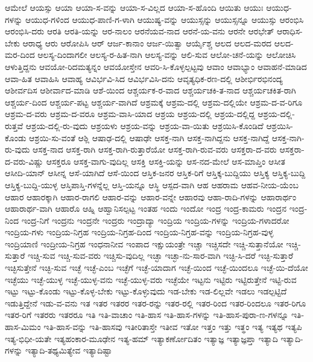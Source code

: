 {ಆಮೇಲೆ
ಆಯಸ್ಸು
ಆಯಾ
ಆಯಾ-ಸ-ವನ್ನು
ಆಯಾ-ಸ-ವಿಲ್ಲದ
ಆಯಾ-ಸ-ಹೊಂದಿ
ಆಯಿತು
ಆಯುಃ
ಆಯುಧ-ಗಳನ್ನು
ಆಯುಧ-ಗಳಿಂದ
ಆಯುಧ-ಪಾಣಿ-ಗ-ಳಾಗಿ
ಆಯುಷ್ಯ-ವನ್ನು
ಆಯುಸ್ಸನ್ನು
ಆಯುಸ್ಸನ್ನೂ
ಆಯುಸ್ಸು
ಆರಂಭಿಸಿ
ಆರಂಭಿಸಿ-ದರು
ಆರತಿ
ಆರತಿ-ಯನ್ನು
ಆರ-ನಾಲಂ
ಆರನೆಯವ-ನಾದ
ಆರನೆ-ಯ-ವನು
ಆರನೇ
ಆರಭೇತ್
ಆರಾಧಿಸ-ಬೇಕು
ಆರಾಧ್ಯ
ಆರು
ಆರೋಪಿಸಿ
ಆರ್
ಆರ್ಜ-ಕಾನಾಂ
ಆರ್ಜ-ಯಿತ್ವಾ
ಆರ್ಯೈಶ್ಚ
ಆಲದ
ಆಲದ-ಮರದ
ಆಲದ-ಮರ-ದಿಂದ
ಆಲಸ್ಯ-ದಿಂದಾಗಲೀ
ಆಲಸ್ಯ-ರ-ಹಿತ-ನಾಗಿ
ಆಲಸ್ಯ-ವನ್ನು
ಆಲಿ-ಸುವ
ಆಲೋ-ಚನೆ-ಯನ್ನು
ಆಲೋಚಿಸಿ
ಆಳುತ್ತಿದ್ದನು
ಆವಯೋ-ರಿದಮತ್ಯನ್ನಂ
ಆವಯೋಸ್ತೇನ
ಆವರಿ-ಸಿ-ಕೊಳ್ಳಲ್ಪಟ್ಟವು
ಆವಾಂ
ಆವಾಭ್ಯಾಂ
ಆವಾಹನೆ-ಮಾಡಿದ
ಆವಾ-ಹಿತ
ಆವಾಹಿಸಿ
ಆವಾಹ್ಯ
ಆವಿರ್ಭವಿ-ಸಿದ
ಆವಿರ್ಭವಿಸಿ-ದನು
ಆವೃತ್ಯಧಿಕ-ರಣ-ದಲ್ಲಿ
ಆಶೀರ್ಭಿರಭಿನಂದ್ಯ
ಆಶೀರ್ವದಿಸ
ಆಶೀರ್ವಾದ-ಮಾಡಿ
ಆಶೆ-ಯಿಂದ
ಆಶ್ಚರ್ಯಕ-ರ-ವಾದ
ಆಶ್ಚರ್ಯಚಕಿ-ತ-ನಾದ
ಆಶ್ಚರ್ಯಚಕಿತ-ರಾಗಿ
ಆಶ್ಚರ್ಯ-ದಿಂದ
ಆಶ್ಚರ್ಯ-ಪಟ್ಟ
ಆಶ್ಚರ್ಯ-ವಾಗಿದೆ
ಆಶ್ರಮಕ್ಕೆ
ಆಶ್ರಮ-ದಲ್ಲಿ
ಆಶ್ರಮ-ದಲ್ಲಿಯೇ
ಆಶ್ರಮ-ದ-ವ-ರಿಗೂ
ಆಶ್ರಮ-ದ-ವರು
ಆಶ್ರಮ-ದ-ವರೂ
ಆಶ್ರಮ-ವಾಸಿ-ಯಾದ
ಆಶ್ರಯ
ಆಶ್ರಯ-ದಲ್ಲಿ
ಆಶ್ರಯ-ದಲ್ಲಿದ್ದ
ಆಶ್ರಯ-ದಲ್ಲಿ-ರುತ್ತವೆ
ಆಶ್ರಯ-ದಲ್ಲಿ-ರು-ವುದು
ಆಶ್ರಯಳು
ಆಶ್ರಯ-ವನ್ನು
ಆಶ್ರಯ-ವಾ-ಯಿತು
ಆಶ್ರಯಿಸಿ-ಕೊಂಡಿದೆ
ಆಶ್ರಯಿಸಿ-ಕೊಂಡು
ಆಶ್ರಯಿ-ಸು-ವಂತೆ
ಆಶ್ಲಿ
ಆಷಾಢ-ದಲ್ಲಿ
ಆಷಾಢೇ
ಆಸಕ್ತ-ನಾಗಿ
ಆಸಕ್ತ-ನಾಗಿದ್ದನು
ಆಸಕ್ತ-ನಾಗಿದ್ದೆ
ಆಸಕ್ತ-ನಾಗಿ-ರು-ವುದು
ಆಸಕ್ತ-ನಾದ
ಆಸಕ್ತ-ರಾಗಿ
ಆಸಕ್ತ-ರಾಗಿ-ರುತ್ತಾರೆಯೋ
ಆಸಕ್ತ-ರಾಗಿ-ರುವ-ವರು
ಆಸಕ್ತರಾ-ದ-ವರು
ಆಸಕ್ತರಾ-ದ-ವರು-ವಿಷ್ಣು
ಆಸಕ್ತರೂ
ಆಸಕ್ತ-ವಾಗು-ವುದಿಲ್ಲ
ಆಸಕ್ತಿ
ಆಸಕ್ತಿ-ಯನ್ನು
ಆಸ-ನದ-ಮೇಲೆ
ಆಸ-ಮಾಪ್ತಿಂ
ಆಸೀತ
ಆಸೀದಿ-ಯಾನ್
ಆಸೀನ್ನ
ಆಸೆ-ಯಾಗಿದೆ
ಆಸೆ-ಯಿಂದ
ಆಸ್ತಿಕ-ಜನರ
ಆಸ್ತಿಕ-ರಿಗೆ
ಆಸ್ತಿಕ್ಕ-ಬುದ್ದಿಯು
ಆಸ್ತಿಕ್ಯ
ಆಸ್ತಿಕ್ಯ-ಬುದ್ದಿ
ಆಸ್ತಿಕ್ಯ-ಬುದ್ದಿ-ಯುಳ್ಳ
ಆಸ್ತಿಪಾಸ್ತಿ-ಗಳನ್ನೆಲ್ಲ
ಆಸ್ತಿ-ಯನ್ನೂ
ಆಸ್ಥಿ
ಆಸ್ಪದ-ವಾಗಿ
ಆಹ
ಆಹರಾಮ
ಆಹವ-ನೀಯ-ಯೆಂಬ
ಆಹಾರ
ಆಹಾರಕ್ಕಾಗಿ
ಆಹಾರ-ರಾಗಲಿ
ಆಹಾರ-ವನ್ನು
ಆಹಾರ-ವನ್ನೇ
ಆಹಾರವು
ಆಹಾ-ರಾದಿ-ಗಳನ್ನು
ಆಹಾರಾರ್ಥಂ
ಆಹಾರಾರ್ಥ-ವಾಗಿ
ಆಹಾರೊ
ಆಹ್ನಿ
ಆಹ್ವಾನಿಸಲ್ಪಟ್ಟ
ಇಂತಹ
ಇಂದು
ಇಂದೋ
ಇಂದ್ರ
ಇಂದ್ರ-ಕಾಮರು
ಇಂದ್ರನ
ಇಂದ್ರ-ನಿಂದ
ಇಂದ್ರ-ನಿಗೆ
ಇಂದ್ರನು
ಇಂದ್ರನೇ
ಇಂದ್ರರು
ಇಂದ್ರಾದ್ಯಾ
ಇಂದ್ರಿಯ
ಇಂದ್ರಿಯ-ಗಳನ್ನು
ಇಂದ್ರಿಯ-ಗಳಾದರೋ
ಇಂದ್ರಿಯ-ಗಳು
ಇಂದ್ರಿಯ-ನಿಗ್ರಹ
ಇಂದ್ರಿಯ-ನಿಗ್ರಹ-ದಿಂದ
ಇಂದ್ರಿಯ-ನಿಗ್ರಹ-ವನ್ನು
ಇಂದ್ರಿಯ-ನಿಗ್ರಹ-ವುಳ್ಳ
ಇಂದ್ರಿಯಾಣಿ
ಇಂದ್ರೀಯ-ನಿಗ್ರಹ
ಇಂಧನಾನೀವ
ಇಂಪಾದ
ಇಕ್ಷುಯಂತ್ರೇ
ಇಚ್ಚಾ
ಇಚ್ಚಿಸದೇ
ಇಚ್ಚಿ-ಸುತ್ತಾನೆಯೋ
ಇಚ್ಚಿ-ಸುತ್ತಾರೆ
ಇಚ್ಚಿ-ಸುವ
ಇಚ್ಚಿ-ಸುವ-ವರು
ಇಚ್ಚಿಸು-ವುದಿಲ್ಲ
ಇಚ್ಛಾ
ಇಚ್ಛಾ-ನು-ಸಾರ-ವಾಗಿ
ಇಚ್ಛಿ-ಸಿ-ದರೆ
ಇಚ್ಛಿ-ಸುತ್ತಾರೆ
ಇಚ್ಛಿಸುತ್ತೇನೆ
ಇಚ್ಛಿ-ಸುವ
ಇಚ್ಛೆ
ಇಚ್ಛೆ-ಎಂಬ
ಇಚ್ಛೆಗೆ
ಇಚ್ಛೆ-ಯಾದಾಗ
ಇಚ್ಛೆ-ಯಿಂದ
ಇಚ್ಛೆ-ಯಿಂದಲೂ
ಇಚ್ಛೆ-ಯಿ-ದೆಯೋ
ಇಚ್ಛೆಯು
ಇಚ್ಛೆ-ಯುಳ್ಳ
ಇಚ್ಛೆ-ಯುಳ್ಳ-ವನು
ಇಚ್ಛೆ-ಯುಳ್ಳ-ವರು
ಇಚ್ಛೆಯೇ
ಇಟ್ಟನು
ಇಟ್ಟಿರು
ಇಟ್ಟಿರುತ್ತೇನೆ
ಇಟ್ಟಿ-ರುವ
ಇಟ್ಟು
ಇಟ್ಟು-ಕೊಂಡು
ಇಟ್ಟು-ಕೊಳ್ಳ-ಬೇಕು
ಇಟ್ಟು-ಕೊಳ್ಳುವುದು
ಇಡ-ಬೇಕು
ಇಡ-ಲಿಲ್ಲವೇ
ಇಡಲು
ಇಡಲ್ಪಟ್ಟಿದೆ
ಇಡುತ್ತಿದ್ದೇನೆ
ಇಡು-ವ-ವನು
ಇತ
ಇತರ
ಇತರರ
ಇತರ-ರನ್ನು
ಇತರ-ರಲ್ಲಿ
ಇತರ-ರಿಂದ
ಇತರ-ರಿಂದಲೂ
ಇತರ-ರಿಗೂ
ಇತರ-ರಿಗೆ
ಇತರರು
ಇತರರೂ
ಇತಿ
ಇತಿ-ವಾಚಾಂ
ಇತಿ-ಹಾಸ
ಇತಿ-ಹಾಸ-ಗಳನ್ನು
ಇತಿ-ಹಾಸ-ಪುರಾ-ಣ-ಗಳನ್ನೂ
ಇತಿ-ಹಾಸ-ಮಿಮಂ
ಇತಿ-ಹಾಸ-ವನ್ನು
ಇತಿ-ಹಾಸವು
ಇತೀರಿತಾಸ್ತೇ
ಇತೀವ
ಇತೋ
ಇತ್ತಂ
ಇತ್ತು
ಇತ್ಥಂ
ಇತ್ಯ
ಇತ್ಯಥ
ಇತ್ಯಪಿ
ಇತ್ಯ-ಭಿಧೀ-ಯತೇ
ಇತ್ಯಹಂಕಾರ-ಮೂಢೇನ
ಇತ್ಯ-ಹಮ್
ಇತ್ಯಾಕರ್ಣೋದಿತಂ
ಇತ್ಯಾಜ್ಞ
ಇತ್ಯಾಜ್ಞಪ್ತಾ
ಇತ್ಯಾದಿ
ಇತ್ಯಾದಿ-ಗಳನ್ನು
ಇತ್ಯಾದಿ-ತಥ್ಯಮಿತ್ಯೇವ
ಇತ್ಯಾದಿಷ್ಟಾ
}

